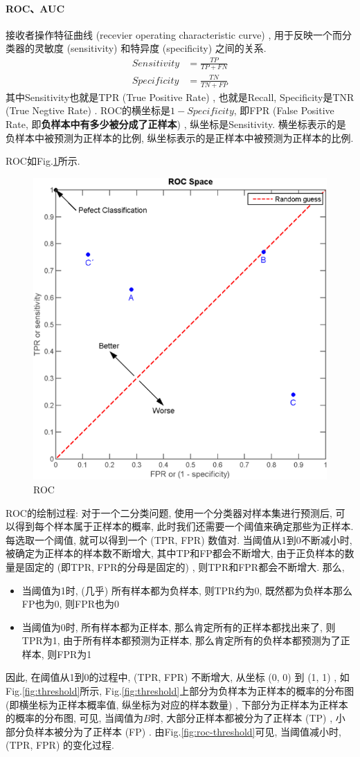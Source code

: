 \paragraph{ROC、AUC}接收者操作特征曲线 (recevier operating characteristic curve) , 用于反映一个而分类器的灵敏度 (sensitivity) 和特异度 (specificity) 之间的关系. 
$$
\begin{aligned}
	Sensitivity &= \frac{TP}{TP + FN}\\
	Specificity &= \frac{TN}{TN + FP}
\end{aligned}
$$
其中Sensitivity也就是TPR (True Positive Rate) , 也就是Recall, Specificity是TNR (True Negtive Rate) . ROC的横坐标是$1 - Specificity$, 即FPR (False Positive Rate, 即\textbf{负样本中有多少被分成了正样本}) , 纵坐标是Sensitivity. 横坐标表示的是负样本中被预测为正样本的比例, 纵坐标表示的是正样本中被预测为正样本的比例. 

ROC如Fig.\ref{fig:roc}所示. 

\begin{figure}[h]
	\centering
	\includegraphics[width=.6\textwidth]{pics/roc.png}
	\caption{ROC}
	\label{fig:roc}
\end{figure}
ROC的绘制过程: 对于一个二分类问题, 使用一个分类器对样本集进行预测后, 可以得到每个样本属于正样本的概率, 此时我们还需要一个阈值来确定那些为正样本. 每选取一个阈值, 就可以得到一个 (TPR, FPR) 数值对. 当阈值从1到0不断减小时, 被确定为正样本的样本数不断增大, 其中TP和FP都会不断增大, 由于正负样本的数量是固定的 (即TPR, FPR的分母是固定的) , 则TPR和FPR都会不断增大. 那么, 
\begin{itemize}
	\item 当阈值为1时,  (几乎) 所有样本都为负样本, 则TPR约为0, 既然都为负样本那么FP也为0, 则FPR也为0
	\item 当阈值为0时, 所有样本都为正样本, 那么肯定所有的正样本都找出来了, 则TPR为1, 由于所有样本都预测为正样本, 那么肯定所有的负样本都预测为了正样本, 则FPR为1
\end{itemize}
因此, 在阈值从1到0的过程中,  (TPR, FPR) 不断增大, 从坐标 (0, 0) 到 (1, 1) , 如Fig.\ref{fig:threshold}所示, Fig.\ref{fig:threshold}上部分为负样本为正样本的概率的分布图 (即横坐标为正样本概率值, 纵坐标为对应的样本数量) , 下部分为正样本为正样本的概率的分布图, 可见, 当阈值为$B$时, 大部分正样本都被分为了正样本 (TP) , 小部分负样本被分为了正样本 (FP) . 由Fig.\ref{fig:roc-threshold}可见, 当阈值减小时,  (TPR, FPR) 的变化过程. 

